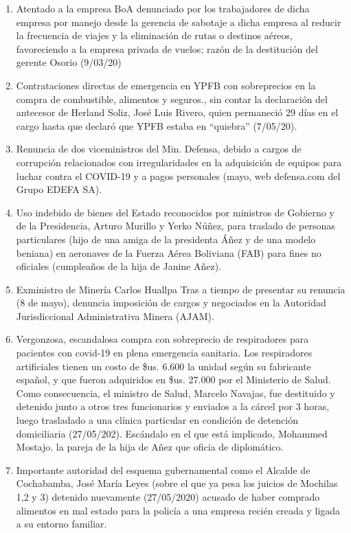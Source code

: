 \documentclass[a4paper, nobind]{templates/ociamthesis}
\begin{document}
\begin{enumerate}
\item
  Atentado a la empresa BoA denunciado por los trabajadores de dicha empresa por manejo desde la gerencia de sabotaje a dicha empresa al reducir la frecuencia de viajes y la eliminación de rutas o destinos aéreos, favoreciendo a la empresa privada de vuelos; razón de la destitución del gerente Osorio (9/03/20)
\item
  Contrataciones directas de emergencia en YPFB con sobreprecios en la compra de combustible, alimentos y seguros., sin contar la declaración del antecesor de Herland Soliz, José Luis Rivero, quien permaneció 29 días en el cargo hasta que declaró que YPFB estaba en ``quiebra'' (7/05/20).
\item
  Renuncia de dos viceministros del Min. Defensa, debido a cargos de corrupción relacionados con irregularidades en la adquisición de equipos para luchar contra el COVID-19 y a pagos personales (mayo, web defensa.com del Grupo EDEFA SA).
\item
  Uso indebido de bienes del Estado reconocidos por ministros de Gobierno y de la Presidencia, Arturo Murillo y Yerko Núñez, para traslado de personas particulares (hijo de una amiga de la presidenta Áñez y de una modelo beniana) en aeronaves de la Fuerza Aérea Boliviana (FAB) para fines no oficiales (cumpleaños de la hija de Janine Añez).
\item
  Exministro de Minería Carlos Huallpa Tras a tiempo de presentar su renuncia (8 de mayo), denuncia imposición de cargos y negociados en la Autoridad Jurisdiccional Administrativa Minera (AJAM).
\item
  Vergonzosa, escandalosa compra con sobreprecio de respiradores para pacientes con covid-19 en plena emergencia sanitaria. Los respiradores artificiales tienen un costo de \$us. 6.600 la unidad según su fabricante español, y que fueron adquiridos en \$us. 27.000 por el Ministerio de Salud. Como consecuencia, el ministro de Salud, Marcelo Navajas, fue destituido y detenido junto a otros tres funcionarios y enviados a la cárcel por 3 horas, luego trasladado a una clínica particular en condición de detención domiciliaria (27/05/202). Escándalo en el que está implicado, Mohammed Mostajo. la pareja de la hija de Añez que oficia de diplomático.
\item
  Importante autoridad del esquema gubernamental como el Alcalde de Cochabamba, José María Leyes (sobre el que ya pesa los juicios de Mochilas 1,2 y 3) detenido nuevamente (27/05/2020) acusado de haber comprado alimentos en mal estado para la policía a una empresa recién creada y ligada a su entorno familiar.

\end{enumerate}
\end{document}
